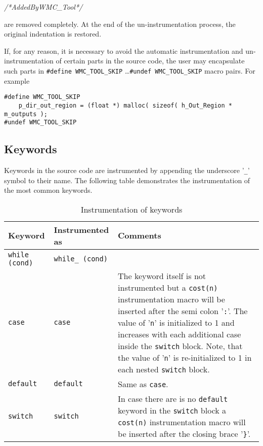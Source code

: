 {
{\em /*AddedByWMC\_Tool*/}
}

are removed completely. At the end of the un-instrumentation process, the original indentation is restored.

If, for any reason, it is necessary to avoid the automatic instrumentation and un-instrumentation of certain parts in the source code, the user may encapsulate such parts in \verb|#define WMC_TOOL_SKIP| \ldots \verb|#undef WMC_TOOL_SKIP| macro pairs. For example

\begin{Verbatim}[fontsize=\small]
#define WMC_TOOL_SKIP
    p_dir_out_region = (float *) malloc( sizeof( h_Out_Region * m_outputs );
#undef WMC_TOOL_SKIP
\end{Verbatim}

\subsection{Keywords}

Keywords in the source code are instrumented by appending the underscore '\verb|_|' symbol to their name. The following table demonstrates the instrumentation of the most common keywords.

\begin{table}
\raggedleft\small
\caption{Instrumentation of keywords}
\begin{tabular}{|l|p{}<{\raggedright}|p{}<{\raggedright}|}
\hline
\textbf{Keyword} & \textbf{Instrumented as} & \textbf{Comments} \\
\hline
\verb|while (cond)| & \verb|while_ (cond)| & \\
\hline
\verb|case| & \verb|case| & The keyword itself is not instrumented but a \verb|cost(n)| instrumentation macro will be inserted after the semi colon '\verb|:|'. The value of '\verb|n|' is initialized to 1 and increases with each additional case inside the \verb|switch| block. Note, that the value of '\verb|n|' is re-initialized to 1 in each nested \verb|switch| block. \\
\hline
\verb|default| & \verb|default| & Same as \verb|case|. \\
\hline
\verb|switch| & \verb|switch| & In case there are is no \verb|default| keyword in the \verb|switch| block a \verb|cost(n)| instrumentation macro will be inserted after the closing brace '\verb|}|'. \\
\hline
\end{tabular}
\label{tab:instrumentation_of_keywords}
\end{table}

